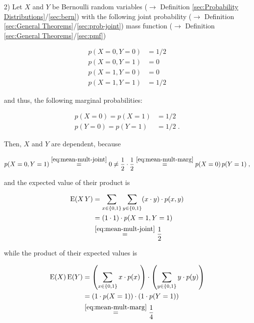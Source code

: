 \documentclass[a4paper,12pt,twoside]{book}
\begin{document}
\vspace{1em}
2) Let $X$ and $Y$ be Bernoulli random variables ($\rightarrow$ Definition \ref{sec:Probability Distributions}/\ref{sec:bern}) with the following joint probability ($\rightarrow$ Definition \ref{sec:General Theorems}/\ref{sec:prob-joint}) mass function ($\rightarrow$ Definition \ref{sec:General Theorems}/\ref{sec:pmf})

\begin{equation} \label{eq:mean-mult-joint}
\begin{split}
p(X=0, Y=0) &= 1/2 \\
p(X=0, Y=1) &= 0 \\
p(X=1, Y=0) &= 0 \\
p(X=1, Y=1) &= 1/2
\end{split}
\end{equation}

and thus, the following marginal probabilities:

\begin{equation} \label{eq:mean-mult-marg}
\begin{split}
p(X=0) = p(X=1) &= 1/2 \\
p(Y=0) = p(Y=1) &= 1/2 \; .
\end{split}
\end{equation}

Then, $X$ and $Y$ are dependent, because

\begin{equation} \label{eq:mean-mult-dep}
p(X=0, Y=1) \overset{\eqref{eq:mean-mult-joint}}{=} 0 \neq \frac{1}{2} \cdot \frac{1}{2} \overset{\eqref{eq:mean-mult-marg}}{=} p(X=0) \, p(Y=1) \; ,
\end{equation}

and the expected value of their product is

\begin{equation} \label{eq:mean-mult-mean-prod}
\begin{split}
\mathrm{E}(X\,Y) &= \sum_{x \in \left\lbrace 0,1 \right\rbrace} \sum_{y \in \left\lbrace 0,1 \right\rbrace} (x \cdot y) \cdot p(x,y) \\
&= (1 \cdot 1) \cdot p(X=1, Y=1) \\
&\overset{\eqref{eq:mean-mult-joint}}{=} \frac{1}{2}
\end{split}
\end{equation}

while the product of their expected values is

\begin{equation} \label{eq:mean-mult-prod-mean}
\begin{split}
\mathrm{E}(X) \, \mathrm{E}(Y) &= \left( \sum_{x \in \left\lbrace 0,1 \right\rbrace} x \cdot p(x) \right) \cdot \left( \sum_{y \in \left\lbrace 0,1 \right\rbrace} y \cdot p(y) \right) \\
&= \left( 1 \cdot p(X=1) \right) \cdot \left( 1 \cdot p(Y=1) \right) \\
&\overset{\eqref{eq:mean-mult-marg}}{=} \frac{1}{4}
\end{split}
\end{equation}
\end{document}
